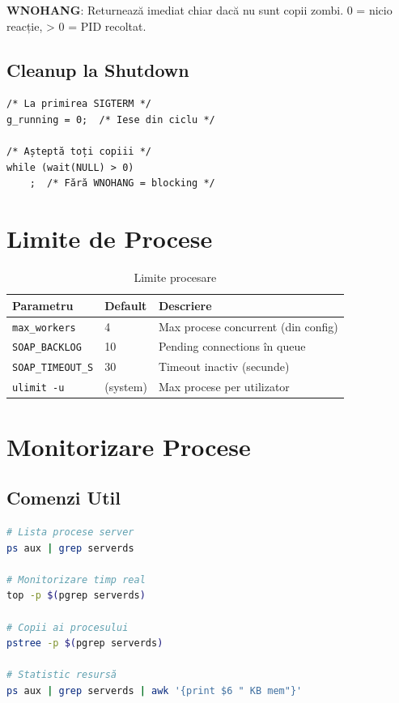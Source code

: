 \documentclass[12pt,a4paper,oneside]{book}
\begin{document}
\textbf{WNOHANG}: Returnează imediat chiar dacă nu sunt copii zombi. 0 = nicio reacție, > 0 = PID recoltat.

\subsection{Cleanup la Shutdown}

\begin{lstlisting}[caption=Cleanup la terminare server]
/* La primirea SIGTERM */
g_running = 0;  /* Iese din ciclu */

/* Așteptă toți copiii */
while (wait(NULL) > 0)
    ;  /* Fără WNOHANG = blocking */
\end{lstlisting}

\section{Limite de Procese}

\begin{table}[H]
\centering
\begin{tabularx}{\textwidth}{|l|l|X|}
\hline
\textbf{Parametru} & \textbf{Default} & \textbf{Descriere} \\
\hline
\texttt{max\_workers} & 4 & Max procese concurrent (din config) \\
\hline
\texttt{SOAP\_BACKLOG} & 10 & Pending connections în queue \\
\hline
\texttt{SOAP\_TIMEOUT\_S} & 30 & Timeout inactiv (secunde) \\
\hline
\texttt{ulimit -u} & (system) & Max procese per utilizator \\
\hline
\end{tabularx}
\caption{Limite procesare}
\end{table}

\section{Monitorizare Procese}

\subsection{Comenzi Util}

\begin{lstlisting}[language=bash]
# Lista procese server
ps aux | grep serverds

# Monitorizare timp real
top -p $(pgrep serverds)

# Copii ai procesului
pstree -p $(pgrep serverds)

# Statistic resursă
ps aux | grep serverds | awk '{print $6 " KB mem"}'
\end{lstlisting}
\end{document}
